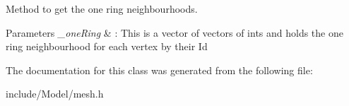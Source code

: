 Method to get the one ring neighbourhoods. 


\begin{DoxyParams}{Parameters}
{\em \+\_\+one\+Ring} & \+: This is a vector of vectors of ints and holds the one ring neighbourhood for each vertex by their Id \\
\hline
\end{DoxyParams}


The documentation for this class was generated from the following file\+:\begin{DoxyCompactItemize}
\item 
include/\+Model/mesh.\+h\end{DoxyCompactItemize}
